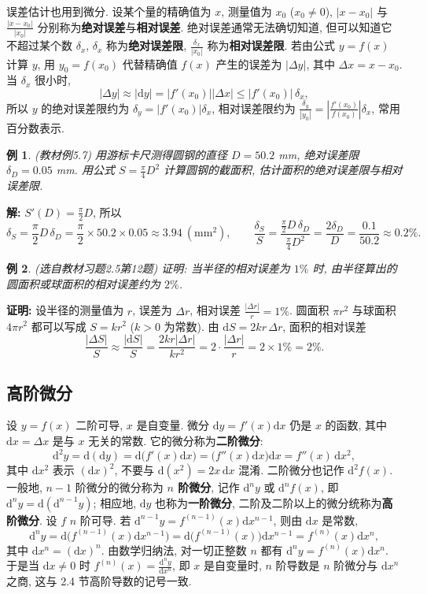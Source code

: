 \documentclass[UTF8,openany]{ctexbook}
\theoremstyle{chinesetextbook}
\newtheorem{example}{例}[section]
\newenvironment{cnproof}{\par\indent\textbf{证明:} \ignorespaces}{\par}
\newenvironment{cnsolution}{\par\indent\textbf{解:} \ignorespaces}{\par}
\newcommand{\dd}{\mathrm d}
\begin{document}
误差估计也用到微分. 设某个量的精确值为 $x$, 测量值为 $x_0$ ($x_0\ne0$), $|x-x_0|$ 与 $\displaystyle\frac{|x-x_0|}{|x_0|}$ 分别称为\textbf{绝对误差}与\textbf{相对误差}. 绝对误差通常无法确切知道, 但可以知道它不超过某个数 $\delta_x$, $\delta_x$ 称为\textbf{绝对误差限}, $\displaystyle\frac{\delta_x}{|x_0|}$ 称为\textbf{相对误差限}. 若由公式 $y=f(x)$ 计算 $y$, 用 $y_0=f(x_0)$ 代替精确值 $f(x)$ 产生的误差为 $|\Delta y|$, 其中 $\Delta x=x-x_0$. 当 $\delta_x$ 很小时,
\[
|\Delta y|\approx|\dd y|=|f'(x_0)||\Delta x|\le|f'(x_0)|\,\delta_x,
\]
所以 $y$ 的绝对误差限约为 $\delta_y=|f'(x_0)|\delta_x$, 相对误差限约为 $\displaystyle\frac{\delta_y}{|y_0|}=\left|\frac{f'(x_0)}{f(x_0)}\right|\delta_x$, 常用百分数表示.
\begin{example}\label{ex:c2-5-7}
\textnormal{(教材例5.7)} 用游标卡尺测得圆钢的直径 $D=50.2$ mm, 绝对误差限 $\delta_D=0.05$ mm. 用公式 $\displaystyle S=\frac\pi4D^2$ 计算圆钢的截面积, 估计面积的绝对误差限与相对误差限.
\end{example}
\begin{cnsolution}
$\displaystyle S'(D)=\frac\pi2D$, 所以
\[
\delta_S=\frac\pi2D\,\delta_D=\frac\pi2\times50.2\times0.05\approx3.94\ (\text{mm}^2),\qquad\frac{\delta_S}S=\frac{\frac\pi2D\,\delta_D}{\frac\pi4D^2}=\frac{2\delta_D}D=\frac{0.1}{50.2}\approx0.2\%.
\]
\end{cnsolution}
\begin{example}\label{ex:c2-h5-12}
\textnormal{(选自教材习题2.5第12题)} 证明: 当半径的相对误差为 $1\%$ 时, 由半径算出的圆面积或球面积的相对误差约为 $2\%$.
\end{example}
\begin{cnproof}
设半径的测量值为 $r$, 误差为 $\Delta r$, 相对误差 $\displaystyle\frac{|\Delta r|}r=1\%$. 圆面积 $\pi r^2$ 与球面积 $4\pi r^2$ 都可以写成 $S=kr^2$ ($k>0$ 为常数). 由 $\dd S=2kr\,\Delta r$, 面积的相对误差
\[
\frac{|\Delta S|}S\approx\frac{|\dd S|}S=\frac{2kr|\Delta r|}{kr^2}=2\cdot\frac{|\Delta r|}r=2\times1\%=2\%.
\]
\end{cnproof}
\subsection{高阶微分}
设 $y=f(x)$ 二阶可导, $x$ 是自变量. 微分 $\dd y=f'(x)\dd x$ 仍是 $x$ 的函数, 其中 $\dd x=\Delta x$ 是与 $x$ 无关的常数. 它的微分称为\textbf{二阶微分}:
\[
\dd^2y=\dd(\dd y)=\dd\bigl(f'(x)\dd x\bigr)=\bigl(f''(x)\dd x\bigr)\dd x=f''(x)\,\dd x^2,
\]
其中 $\dd x^2$ 表示 $(\dd x)^2$, 不要与 $\dd(x^2)=2x\,\dd x$ 混淆. 二阶微分也记作 $\dd^2f(x)$. 一般地, $n-1$ 阶微分的微分称为 \textbf{$n$ 阶微分}, 记作 $\dd^ny$ 或 $\dd^nf(x)$, 即 $\dd^ny=\dd(\dd^{n-1}y)$; 相应地, $\dd y$ 也称为\textbf{一阶微分}, 二阶及二阶以上的微分统称为\textbf{高阶微分}. 设 $f$ $n$ 阶可导. 若 $\dd^{n-1}y=f^{(n-1)}(x)\dd x^{n-1}$, 则由 $\dd x$ 是常数,
\[
\dd^ny=\dd\bigl(f^{(n-1)}(x)\dd x^{n-1}\bigr)=\dd\bigl(f^{(n-1)}(x)\bigr)\dd x^{n-1}=f^{(n)}(x)\dd x^n,
\]
其中 $\dd x^n=(\dd x)^n$. 由数学归纳法, 对一切正整数 $n$ 都有 $\dd^ny=f^{(n)}(x)\dd x^n$. 于是当 $\dd x\ne0$ 时 $\displaystyle f^{(n)}(x)=\frac{\dd^ny}{\dd x^n}$, 即 $x$ 是自变量时, $n$ 阶导数是 $n$ 阶微分与 $\dd x^n$ 之商, 这与 2.4 节高阶导数的记号一致.
\end{document}
